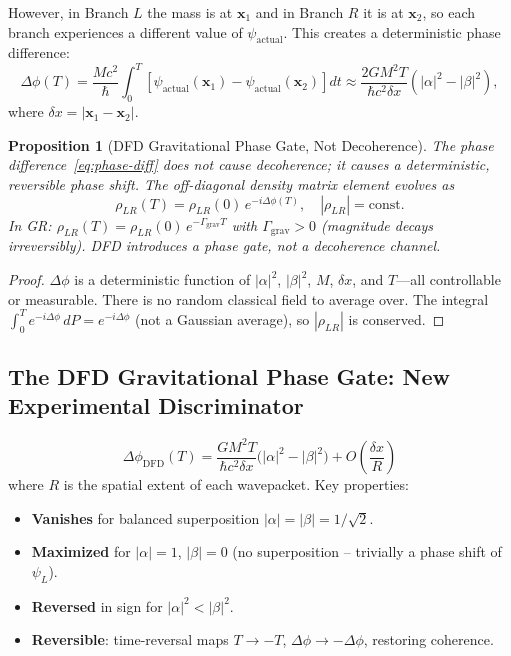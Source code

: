 \documentclass[11pt]{article}
\newtheorem{proposition}[theorem]{Proposition}
\theoremstyle{definition}
\theoremstyle{remark}
\begin{document}
However, in Branch $L$ the mass is at $\mathbf{x}_1$ and in Branch $R$ it is
at $\mathbf{x}_2$, so each branch experiences a different value of
$\psi_{\mathrm{actual}}$.  This creates a deterministic phase difference:
\begin{equation}
  \Delta\phi(T) = \frac{Mc^2}{\hbar}\int_0^T\!
  \left[\psi_{\mathrm{actual}}(\mathbf{x}_1) - \psi_{\mathrm{actual}}(\mathbf{x}_2)\right]dt
  \approx \frac{2GM^2 T}{\hbar c^2\delta x}(|\alpha|^2 - |\beta|^2),
  \label{eq:phase-diff}
\end{equation}
where $\delta x = |\mathbf{x}_1 - \mathbf{x}_2|$.

\begin{proposition}[DFD Gravitational Phase Gate, Not Decoherence]
\label{prop:phase-gate}
The phase difference~\eqref{eq:phase-diff} does not cause decoherence;
it causes a \emph{deterministic, reversible phase shift}.  The off-diagonal
density matrix element evolves as
\begin{equation}
  \rho_{LR}(T) = \rho_{LR}(0)\,e^{-i\Delta\phi(T)}, \quad |\rho_{LR}| = \text{const.}
\end{equation}
In GR: $\rho_{LR}(T) = \rho_{LR}(0)\,e^{-\Gamma_{\mathrm{grav}}T}$ with
$\Gamma_{\mathrm{grav}} > 0$ (magnitude decays irreversibly).  DFD introduces a
phase gate, not a decoherence channel.
\end{proposition}

\begin{proof}
$\Delta\phi$ is a deterministic function of $|\alpha|^2$, $|\beta|^2$, $M$,
$\delta x$, and $T$---all controllable or measurable.  There is no random classical
field to average over.  The integral $\int_0^T e^{-i\Delta\phi}\,dP = e^{-i\Delta\phi}$
(not a Gaussian average), so $|\rho_{LR}|$ is conserved.
\end{proof}

\subsection{The DFD Gravitational Phase Gate: New Experimental Discriminator}

\begin{equation}
  \boxed{
  \Delta\phi_{\mathrm{DFD}}(T) = \frac{GM^2 T}{\hbar c^2\delta x}
  \bigl(|\alpha|^2 - |\beta|^2\bigr) + O\!\left(\frac{\delta x}{R}\right)
  } \label{eq:dfd-phase-gate}
\end{equation}
where $R$ is the spatial extent of each wavepacket.  Key properties:
\begin{itemize}
  \item \textbf{Vanishes} for balanced superposition $|\alpha| = |\beta| =
        1/\sqrt{2}$.
  \item \textbf{Maximized} for $|\alpha| = 1$, $|\beta| = 0$ (no superposition
        -- trivially a phase shift of $\psi_L$).
  \item \textbf{Reversed} in sign for $|\alpha|^2 < |\beta|^2$.
  \item \textbf{Reversible}: time-reversal maps $T \to -T$, $\Delta\phi \to -\Delta\phi$,
        restoring coherence.
\end{itemize}
\end{document}
